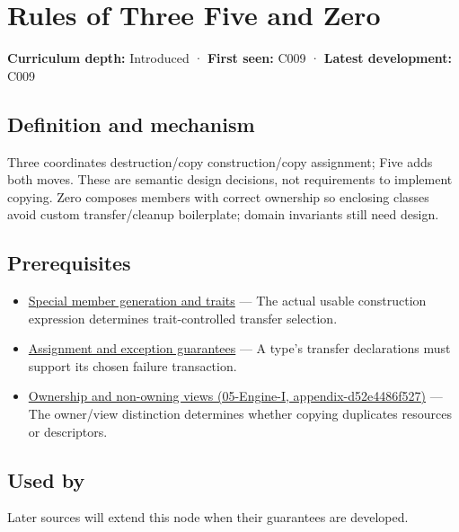\hypertarget{appendix-7679107d057e}{}
\section{Rules of Three Five and Zero}\label{appendix-7679107d057e-rules-of-three-five-and-zero}

\textbf{Curriculum depth:} Introduced · \textbf{First seen:} C009 · \textbf{Latest development:} C009

\subsection{Definition and mechanism}\label{appendix-7679107d057e-definition-and-mechanism}

Three coordinates destruction/copy construction/copy assignment; Five adds both moves. These are semantic design decisions, not requirements to implement copying. Zero composes members with correct ownership so enclosing classes avoid custom transfer/cleanup boilerplate; domain invariants still need design.

\subsection{Prerequisites}\label{appendix-7679107d057e-prerequisites}

\begin{itemize}
\tightlist
\item
  \hyperref[appendix-42e02a12c694]{Special member generation and traits} --- The actual usable construction expression determines trait-controlled transfer selection.
\item
  \hyperref[appendix-bea6beb5350f]{Assignment and exception guarantees} --- A type's transfer declarations must support its chosen failure transaction.
\item
  \href{../05-Engine-I/main.pdf\#nameddest=appendix-d52e4486f527}{Ownership and non-owning views (05-Engine-I, appendix-d52e4486f527)} --- The owner/view distinction determines whether copying duplicates resources or descriptors.
\end{itemize}

\subsection{Used by}\label{appendix-7679107d057e-used-by}

Later sources will extend this node when their guarantees are developed.

